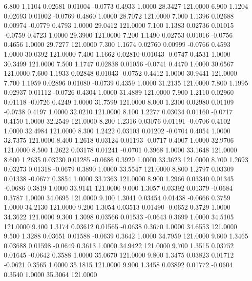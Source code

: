    6.800   1.1104   0.02681   0.01004  -0.0773   0.4933   1.0000  28.3427 121.0000
   6.900   1.1204   0.02693   0.01002  -0.0769   0.4860   1.0000  28.7072 121.0000
   7.000   1.1396   0.02688   0.00974  -0.0779   0.4793   1.0000  29.0412 121.0000
   7.100   1.1383   0.02736   0.01015  -0.0759   0.4723   1.0000  29.3900 121.0000
   7.200   1.1490   0.02753   0.01016  -0.0756   0.4656   1.0000  29.7277 121.0000
   7.300   1.1674   0.02760   0.00999  -0.0766   0.4593   1.0000  30.0392 121.0000
   7.400   1.1662   0.02810   0.01043  -0.0747   0.4531   1.0000  30.3499 121.0000
   7.500   1.1747   0.02838   0.01056  -0.0741   0.4470   1.0000  30.6567 121.0000
   7.600   1.1933   0.02848   0.01043  -0.0752   0.4412   1.0000  30.9441 121.0000
   7.700   1.1959   0.02896   0.01080  -0.0739   0.4359   1.0000  31.2135 121.0000
   7.800   1.1995   0.02937   0.01112  -0.0726   0.4304   1.0000  31.4889 121.0000
   7.900   1.2110   0.02960   0.01118  -0.0726   0.4249   1.0000  31.7599 121.0000
   8.000   1.2300   0.02980   0.01109  -0.0738   0.4197   1.0000  32.0210 121.0000
   8.100   1.2277   0.03034   0.01160  -0.0717   0.4150   1.0000  32.2549 121.0000
   8.200   1.2316   0.03076   0.01191  -0.0706   0.4102   1.0000  32.4984 121.0000
   8.300   1.2422   0.03103   0.01202  -0.0704   0.4054   1.0000  32.7375 121.0000
   8.400   1.2618   0.03124   0.01193  -0.0717   0.4007   1.0000  32.9706 121.0000
   8.500   1.2622   0.03178   0.01241  -0.0701   0.3968   1.0000  33.1648 121.0000
   8.600   1.2635   0.03230   0.01285  -0.0686   0.3929   1.0000  33.3623 121.0000
   8.700   1.2693   0.03273   0.01318  -0.0679   0.3890   1.0000  33.5547 121.0000
   8.800   1.2797   0.03309   0.01338  -0.0677   0.3854   1.0000  33.7363 121.0000
   8.900   1.2966   0.03340   0.01345  -0.0686   0.3819   1.0000  33.9141 121.0000
   9.000   1.3057   0.03392   0.01379  -0.0684   0.3787   1.0000  34.0695 121.0000
   9.100   1.3041   0.03454   0.01438  -0.0666   0.3759   1.0000  34.2130 121.0000
   9.200   1.3054   0.03513   0.01490  -0.0652   0.3729   1.0000  34.3622 121.0000
   9.300   1.3098   0.03566   0.01533  -0.0643   0.3699   1.0000  34.5105 121.0000
   9.400   1.3174   0.03612   0.01565  -0.0638   0.3670   1.0000  34.6553 121.0000
   9.500   1.3288   0.03651   0.01588  -0.0639   0.3642   1.0000  34.7959 121.0000
   9.600   1.3465   0.03688   0.01598  -0.0649   0.3613   1.0000  34.9422 121.0000
   9.700   1.3515   0.03752   0.01645  -0.0642   0.3588   1.0000  35.0670 121.0000
   9.800   1.3475   0.03823   0.01712  -0.0621   0.3565   1.0000  35.1815 121.0000
   9.900   1.3458   0.03892   0.01772  -0.0604   0.3540   1.0000  35.3064 121.0000
